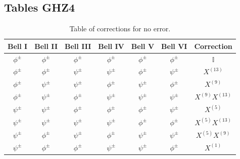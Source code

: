 \documentclass[10pt,a4paper]{book}
\numberwithin{equation}{chapter}
\numberwithin{figure}{chapter}
\numberwithin{table}{chapter}
\begin{document}
\begin{appendices}

\chapter{Tables GHZ4}

\begin{table}[H]
    \centering
    \begin{tabular}{|c c c c c c|c|}
    \hline
   Bell I & Bell II & Bell III & Bell IV & Bell V & Bell VI & Correction  \\
    \hline
  $\phi^{\pm}$&$\phi^{\pm}$&$\phi^{\pm}$&$\phi^{\pm}$&$\phi^{\pm}$&$\phi^{\pm}$&$\mathbb{I}$\\
 $\phi^{\pm}$&$\phi^{\pm}$&$\psi^{\pm}$&$\psi^{\pm}$&$\phi^{\pm}$&$\psi^{\pm}$&$X^{(13)}$ \\ 
 $\phi^{\pm}$&$\psi^{\pm}$&$\psi^{\pm}$&$\phi^{\pm}$&$\psi^{\pm}$&$\phi^{\pm}$&$X^{(9)}$\\
 $\phi^{\pm}$&$\psi^{\pm}$&$\phi^{\pm}$&$\psi^{\pm}$&$\psi^{\pm}$&$\psi^{\pm}$&$X^{(9)}X^{(13)}$\\
  $\psi^{\pm}$&$\psi^{\pm}$&$\phi^{\pm}$&$\phi^{\pm}$&$\phi^{\pm}$&$\psi^{\pm}$&$X^{(5)}$\\
  $\psi^{\pm}$&$\psi^{\pm}$&$\psi^{\pm}$&$\psi^{\pm}$&$\phi^{\pm}$&$\phi^{\pm}$&$X^{(5)}X^{(13)}$\\
  $\psi^{\pm}$&$\phi^{\pm}$&$\psi^{\pm}$&$\phi^{\pm}$&$\psi^{\pm}$&$\psi^{\pm}$&$X^{(5)}X^{(9)}$\\
   $\psi^{\pm}$&$\phi^{\pm}$&$\phi^{\pm}$&$\psi^{\pm}$&$\psi^{\pm}$&$\phi^{\pm}$&$X^{(1)}$\\
   \hline
    \end{tabular}
	\caption{\footnotesize Table of corrections for no error.}
	\label{tab:GHZ4noerror}
\end{table}


\end{appendices}
\end{document}
